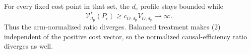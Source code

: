 For every fixed cost point in that set, the \(d_{\mathrm e}\) profile stays bounded while
\[
\mathcal V_{d_{\mathrm p}}^*(P_\epsilon)
\ge c_{O,d_{\mathrm p}}V_{O,d_{\mathrm p}}\longrightarrow\infty.
\]
Thus the arm-normalized ratio diverges. Balanced treatment makes (2) independent of the positive cost vector, so the normalized causal-efficiency ratio diverges as well.